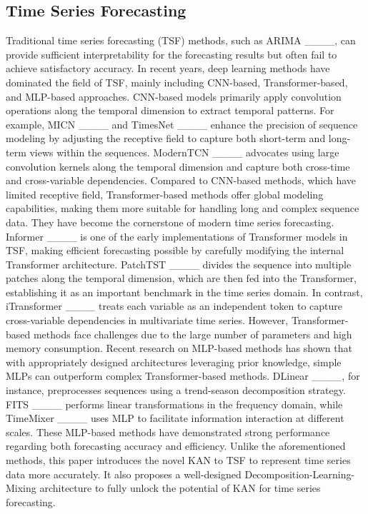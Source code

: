 \subsection{Time Series Forecasting}
Traditional time series forecasting (TSF) methods, such as ARIMA ____, can provide sufficient interpretability for the forecasting results but often fail to achieve satisfactory accuracy. In recent years, deep learning methods have dominated the field of TSF, mainly including CNN-based, Transformer-based, and MLP-based approaches. CNN-based models primarily apply convolution operations along the temporal dimension to extract temporal patterns. For example, MICN ____ and TimesNet ____ enhance the precision of sequence modeling by adjusting the receptive field to capture both short-term and long-term views within the sequences. ModernTCN ____ advocates using large convolution kernels along the temporal dimension and capture both cross-time and cross-variable dependencies.
%
Compared to CNN-based methods, which have limited receptive field, Transformer-based methods offer global modeling capabilities, making them more suitable for handling long and complex sequence data. They have become the cornerstone of modern time series forecasting. Informer ____ is one of the early implementations of Transformer models in TSF, making efficient forecasting possible by carefully modifying the internal Transformer architecture. PatchTST ____ divides the sequence into multiple patches along the temporal dimension, which are then fed into the Transformer, establishing it as an important benchmark in the time series domain. In contrast, iTransformer ____ treats each variable as an independent token to capture cross-variable dependencies in multivariate time series. However, Transformer-based methods face challenges due to the large number of parameters and high memory consumption.
%
Recent research on MLP-based methods has shown that with appropriately designed architectures leveraging prior knowledge, simple MLPs can outperform complex Transformer-based methods. DLinear ____, for instance, preprocesses sequences using a trend-season decomposition strategy. FITS ____ performs linear transformations in the frequency domain, while TimeMixer ____ uses MLP to facilitate information interaction at different scales. These MLP-based methods have demonstrated strong performance regarding both forecasting accuracy and efficiency.
%
Unlike the aforementioned methods, this paper introduces the novel KAN to TSF to represent time series data more accurately. It also proposes a well-designed Decomposition-Learning-Mixing architecture to fully unlock the potential of KAN for time series forecasting.


